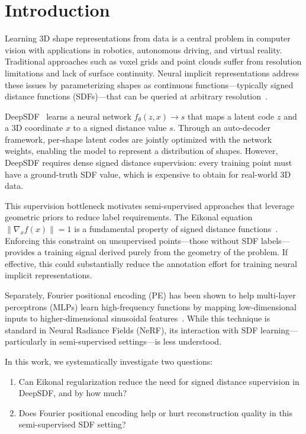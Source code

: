 \documentclass[conference]{IEEEtran}
\begin{document}
\section{Introduction}

Learning 3D shape representations from data is a central problem in computer vision with applications in robotics, autonomous driving, and virtual reality. Traditional approaches such as voxel grids and point clouds suffer from resolution limitations and lack of surface continuity. Neural implicit representations address these issues by parameterizing shapes as continuous functions---typically signed distance functions (SDFs)---that can be queried at arbitrary resolution~\cite{deepsdf}.

DeepSDF~\cite{deepsdf} learns a neural network $f_\theta(z, x) \to s$ that maps a latent code $z$ and a 3D coordinate $x$ to a signed distance value $s$. Through an auto-decoder framework, per-shape latent codes are jointly optimized with the network weights, enabling the model to represent a distribution of shapes. However, DeepSDF requires dense signed distance supervision: every training point must have a ground-truth SDF value, which is expensive to obtain for real-world 3D data.

This supervision bottleneck motivates semi-supervised approaches that leverage geometric priors to reduce label requirements. The Eikonal equation $\|\nabla_x f(x)\| = 1$ is a fundamental property of signed distance functions~\cite{igr}. Enforcing this constraint on unsupervised points---those without SDF labels---provides a training signal derived purely from the geometry of the problem. If effective, this could substantially reduce the annotation effort for training neural implicit representations.

Separately, Fourier positional encoding (PE) has been shown to help multi-layer perceptrons (MLPs) learn high-frequency functions by mapping low-dimensional inputs to higher-dimensional sinusoidal features~\cite{nerf, fourierfeatures}. While this technique is standard in Neural Radiance Fields (NeRF), its interaction with SDF learning---particularly in semi-supervised settings---is less understood.

In this work, we systematically investigate two questions:
\begin{enumerate}
    \item Can Eikonal regularization reduce the need for signed distance supervision in DeepSDF, and by how much?
    \item Does Fourier positional encoding help or hurt reconstruction quality in this semi-supervised SDF setting?
\end{enumerate}
\end{document}
